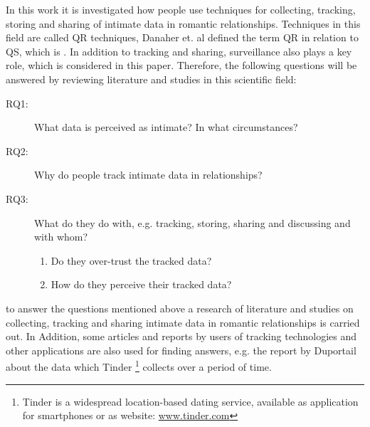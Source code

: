 In this work it is investigated how people use techniques for collecting, tracking, storing and sharing of intimate data in romantic relationships. Techniques in this field are called \ac{QR} techniques, Danaher et. al \cite{doi:10.1080/15265161.2017.1409823} defined the term \acs{QR} in relation to \ac{QS}, which is . In addition to tracking and sharing, surveillance also plays a key role, which is considered in this paper.
Therefore, the following questions will be answered by reviewing literature and studies in this scientific field:
 \begin{description}
 	\item[RQ1:] What data is perceived as intimate? In what circumstances?
 	\item[RQ2:] Why do people track intimate data in relationships?
 	\item[RQ3:] What do they do with, e.g. tracking, storing, sharing and discussing and with whom?
 	\begin{enumerate}
 		\item Do they over-trust the tracked data?
 		\item How do they perceive their tracked data?
 	\end{enumerate}
 \end{description}
to answer the questions mentioned above a research of literature and studies on collecting, tracking and sharing intimate data in romantic relationships is carried out. In Addition, some articles and reports by users of tracking technologies and other applications are also used for finding answers, e.g. the report by Duportail \cite{Duportail2017} about the data which Tinder \footnote{Tinder is a widespread location-based dating service, available as application for smartphones or as website: \url{www.tinder.com}} collects over a period of time.


